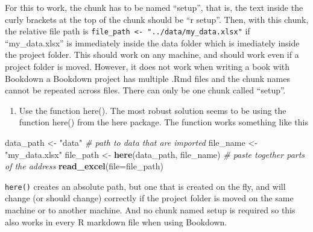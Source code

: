 \documentclass[]{book}
\newenvironment{Shaded}{\begin{snugshade}}{\end{snugshade}}
\newcommand{\KeywordTok}[1]{\textcolor[rgb]{0.13,0.29,0.53}{\textbf{#1}}}
\newcommand{\DataTypeTok}[1]{\textcolor[rgb]{0.13,0.29,0.53}{#1}}
\newcommand{\StringTok}[1]{\textcolor[rgb]{0.31,0.60,0.02}{#1}}
\newcommand{\CommentTok}[1]{\textcolor[rgb]{0.56,0.35,0.01}{\textit{#1}}}
\newcommand{\OperatorTok}[1]{\textcolor[rgb]{0.81,0.36,0.00}{\textbf{#1}}}
\newcommand{\NormalTok}[1]{#1}
\providecommand{\tightlist}{%
  \setlength{\itemsep}{0pt}\setlength{\parskip}{0pt}}
\begin{document}
\begin{Shaded}
\end{Shaded}

For this to work, the chunk has to be named ``setup'', that is, the text
inside the curly brackets at the top of the chunk should be ``r setup''.
Then, with this chunk, the relative file path is
\texttt{file\_path\ \textless{}-\ "../data/my\_data.xlsx"} if
``my\_data.xlsx'' is immediately inside the data folder which is
imediately inside the project folder. This should work on any machine,
and should work even if a project folder is moved. However, it does not
work when writing a book with Bookdown a Bookdown project has multiple
.Rmd files and the chunk names cannot be repeated across files. There
can only be one chunk called ``setup''.

\begin{enumerate}
\def\labelenumi{\arabic{enumi}.}
\setcounter{enumi}{2}
\tightlist
\item
  Use the function here(). The most robust solution seems to be using
  the function here() from the here package. The function works
  something like this
\end{enumerate}

\begin{Shaded}
\begin{Highlighting}[]
\NormalTok{data_path <-}\StringTok{ "data"} \CommentTok{# path to data that are imported}
\NormalTok{file_name <-}\StringTok{ "my_data.xlsx"}
\NormalTok{file_path <-}\StringTok{ }\KeywordTok{here}\NormalTok{(data_path, file_name) }\CommentTok{# paste together parts of the address}
\KeywordTok{read_excel}\NormalTok{(}\DataTypeTok{file=}\NormalTok{file_path)}
\end{Highlighting}
\end{Shaded}

\texttt{here()} creates an absolute path, but one that is created on the
fly, and will change (or should change) correctly if the project folder
is moved on the same machine or to another machine. And no chunk named
setup is required so this also works in every R markdown file when using
Bookdown.
\end{document}
